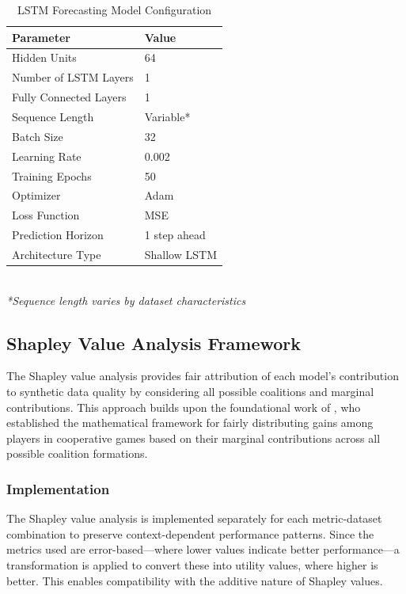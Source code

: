\documentclass{article}
\begin{document}
\begin{table}[H]
\centering
\caption{LSTM Forecasting Model Configuration}
\label{tab:lstm_params}
\small
\begin{tabular}{ll}
\toprule
\textbf{Parameter} & \textbf{Value} \\
\midrule
Hidden Units & 64 \\
Number of LSTM Layers & 1 \\
Fully Connected Layers & 1 \\
Sequence Length & Variable* \\
Batch Size & 32 \\
Learning Rate & 0.002 \\
Training Epochs & 50 \\
Optimizer & Adam \\
Loss Function & MSE \\
Prediction Horizon & 1 step ahead \\
Architecture Type & Shallow LSTM \\
\bottomrule
\end{tabular}
\\[0.5em]
\footnotesize
\textit{*Sequence length varies by dataset characteristics}
\end{table}

\subsection{Shapley Value Analysis Framework}

The Shapley value analysis provides fair attribution of each model's contribution to synthetic data quality by considering all possible coalitions and marginal contributions. This approach builds upon the foundational work of \textcite{shapley_P-295}, who established the mathematical framework for fairly distributing gains among players in cooperative games based on their marginal contributions across all possible coalition formations.

\subsubsection{Implementation}
The Shapley value analysis is implemented separately for each metric-dataset combination to preserve context-dependent performance patterns. Since the metrics used are error-based—where lower values indicate better performance—a transformation is applied to convert these into utility values, where higher is better. This enables compatibility with the additive nature of Shapley values.
\end{document}
